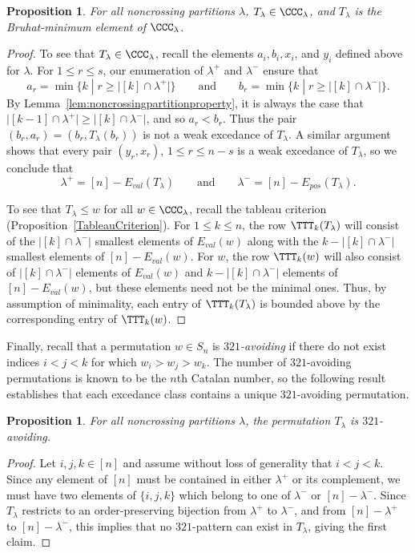 \documentclass[12pt]{amsart}
\newtheorem{prop}[equation]{Proposition}
\theoremstyle{definition}
\theoremstyle{remark}
\numberwithin{equation}{section}
\renewcommand{\setminus}{-}
\newcommand{\EP}{E_{pos}}
\newcommand{\EV}{E_{val}}
\begin{document}
\begin{prop}
\label{prop:321avoid}
For all noncrossing partitions $\lambda$, $T_{\lambda} \in \CCC_{\lambda}$, and $T_{\lambda}$ is the Bruhat-minimum element of $\CCC_{\lambda}$.
\end{prop}
\begin{proof}
To see that $T_{\lambda} \in \CCC_{\lambda}$, recall the elements $a_{i}, b_{i}, x_{i}$, and $y_{i}$ defined above for $\lambda$. For $1 \le r \le s$, our enumeration of $\lambda^{+}$ and $\lambda^{-}$ ensure that
\[
a_{r} = \min\Big\{ k  \;|\;  r \ge \big|[k] \cap \lambda^{+}\big| \Big\}
\qquad\text{and}\qquad
b_{r} = \min\Big\{ k  \;|\;  r \ge \big|[k] \cap \lambda^{-}\big| \Big\}.
\]
By Lemma~\ref{lem:noncrossingpartitionproperty}, it is always the case that $\big|[k-1] \cap \lambda^{+}\big| \ge \big|[k] \cap \lambda^{-}\big|$, and so $a_{r} < b_{r}$.  Thus the pair $(b_{r}, a_{r}) = (b_{r}, T_{\lambda}(b_{r}))$ is not a weak excedance of $T_{\lambda}$.  
A similar argument shows that every pair $(y_{r}, x_{r})$, $1 \le r \le n-s$ is a weak excedance of $T_{\lambda}$, so we conclude that
\[
\lambda^{+} = [n] \setminus \EV(T_{\lambda})
\qquad\text{and}\qquad
\lambda^{-} =  [n] \setminus \EP(T_{\lambda}).
\]

To see that $T_{\lambda} \le w$ for all $w \in \CCC_{\lambda}$, recall the tableau criterion (Proposition~\ref{TableauCriterion}).  
For $1 \le k \le n$, the row $\TTT_{k}(T_{\lambda})$ will consist of the $\big|[k] \cap \lambda^{-}\big|$ smallest elements of $\EV(w)$ along with the $k - |[k] \cap \lambda^{-}|$ smallest elements of $[n] \setminus \EV(w)$.  
For $w$,  the row $\TTT_{k}(w)$ will also consist of $|[k] \cap \lambda^{-}|$ elements of $\EV(w)$ and $k - |[k] \cap \lambda^{-}|$ elements of $[n] \setminus \EV(w)$, but these elements need not be the minimal ones.  
Thus, by assumption of minimality, each entry of $\TTT_{k}(T_{\lambda})$ is bounded above by the corresponding entry of $\TTT_{k}(w)$.
\end{proof}

Finally, recall that a permutation $w \in S_{n}$ is \emph{$321$-avoiding} if there do not exist indices $i < j < k$ for which $w_{i} > w_{j} > w_{k}$.  The number of $321$-avoiding permutations is known to be the $n$th Catalan number, so the following result establishes that each excedance class contains a unique $321$-avoiding permutation.

\begin{prop}
For all noncrossing partitions $\lambda$, the permutation $T_{\lambda}$ is $321$-avoiding.
\end{prop}
\begin{proof}
Let $i, j, k\in [n]$ and assume without loss of generality that $i < j < k$.  Since any element of $[n]$ must be contained in either $\lambda^{+}$ or its complement, we must have two elements of $\{i, j, k\}$ which belong to one of $\lambda^{-}$ or $[n] \setminus \lambda^{-}$.  Since $T_{\lambda}$ restricts to an order-preserving bijection from $\lambda^{+}$ to $\lambda^{-}$, and from $[n] \setminus \lambda^{+}$ to $[n] \setminus \lambda^{-}$, this implies that no $321$-pattern can exist in $T_{\lambda}$, giving the first claim.
\end{proof}
\end{document}
